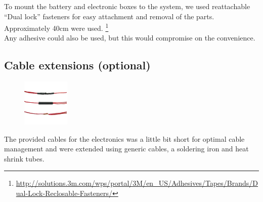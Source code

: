 To mount the battery and electronic boxes to the system, we used reattachable “Dual lock” fasteners for easy attachment and removal of the parts. Approximately 40cm were used. \footnote{\url{http://solutions.3m.com/wps/portal/3M/en_US/Adhesives/Tapes/Brands/Dual-Lock-Reclosable-Fasteners/}}\\
Any adhesive could also be used, but this would compromise on the convenience.


\subsection{Cable extensions (optional)}

\begin{figure}
    \vspace{-1.5cm}
    \includegraphics[width=0.2\textwidth]{GenericParts/Cable-extension.jpg}
\end{figure}

The provided cables for the electronics was a little bit short for optimal cable management and were extended using generic cables, a soldering iron and heat shrink tubes.

